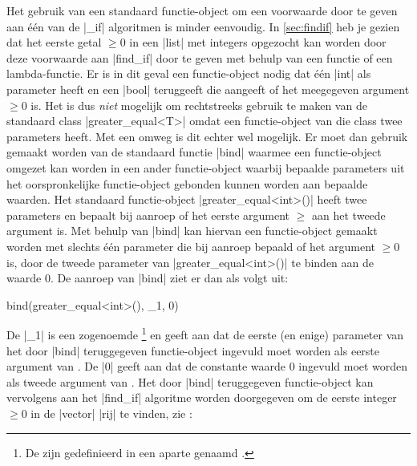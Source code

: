 \begin{cpplstShortInline}
Het gebruik van een standaard functie\hyp{}object om een voorwaarde door te geven aan één van de |_if| algoritmen is minder eenvoudig.
In \cref{sec:findif} heb je gezien dat het eerste getal $\ge{}0$ in een |list| met integers opgezocht kan worden door deze voorwaarde aan |find_if| door te geven met behulp van een functie of een lambda\hyp{}functie.
Er is in dit geval een functie\hyp{}object nodig dat één |int| als parameter heeft en een |bool| teruggeeft die aangeeft of het meegegeven argument $\ge{}0$ is.
Het is dus \emph{niet} mogelijk om rechtstreeks gebruik te maken van de standaard class |greater_equal<T>| omdat een functie\hyp{}object van die class twee parameters heeft.
Met een omweg is dit echter wel mogelijk.
Er moet dan gebruik gemaakt worden van de standaard functie |bind| waarmee een functie\hyp{}object omgezet kan worden in een ander functie\hyp{}object waarbij bepaalde parameters uit het oorspronkelijke functie\hyp{}object gebonden kunnen worden aan bepaalde waarden.
Het standaard functie\hyp{}object |greater_equal<int>()| heeft twee parameters en bepaalt bij aanroep of het eerste argument $\ge{}$ aan het tweede argument is.
Met behulp van |bind| kan hiervan een functie\hyp{}object gemaakt worden met slechts één parameter die bij aanroep bepaald of het argument $\ge{}0$ is, door de tweede parameter van |greater_equal<int>()| te binden aan de waarde $0$.
De aanroep van |bind| ziet er dan als volgt uit: 
\begin{cpplstfragment}
bind(greater_equal<int>(), _1, 0)
\end{cpplstfragment}
De |_1| is een zogenoemde \footnote{%
	De  zijn gedefinieerd in een aparte  genaamd .
} en geeft aan dat de eerste (en enige) parameter van het door |bind| teruggegeven functie\hyp{}object ingevuld moet worden als eerste argument van .
De |0| geeft aan dat de constante waarde $0$ ingevuld moet worden als tweede argument van .
Het door |bind| teruggegeven functie\hyp{}object kan  vervolgens aan het |find_if| algoritme worden doorgegeven om de eerste integer $\ge{}0$ in de |vector| |rij| te vinden, zie :



\end{cpplstShortInline}
